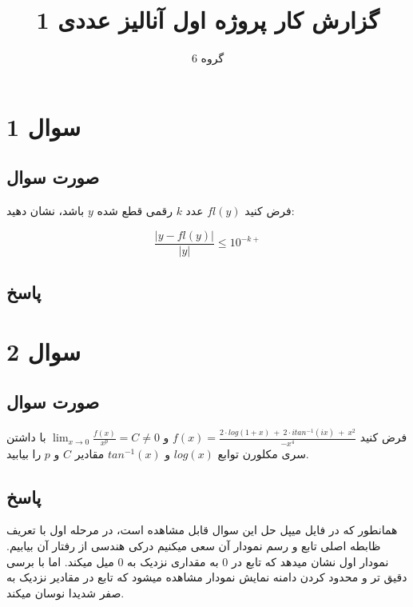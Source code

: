 \documentclass[12pt, letterpaper]{article}
\title{گزارش کار پروژه اول آنالیز عددی 1}
\author{گروه 6}
\begin{document}
\maketitle

\section{سوال 1}
\subsection{صورت سوال}
فرض کنید \(fl(y)\) عدد \(k\) رقمی قطع شده \(y\) باشد، نشان دهید:

\[\frac{\big| y-fl(y) \big| }{\big| y \big|} \le 10^{-k+}\]

\subsection{پاسخ}



\vspace{5mm}

\section{سوال 2}
\subsection{صورت سوال}
فرض کنید
\(f(x) = \frac{2 \cdot log(1+x) \: + \: 2 \cdot i tan^{-1}(ix) \: + \: x^2}{-x^4}\)
و 
\(\lim_{x\to 0}\frac{f(x)}{x^p} = C \ne 0\)
با داشتن سری مکلورن توابع 
\(log(x)\)
و 
\(tan^{-1}(x)\)
مقادیر 
\(C\)
و 
\(p\)
را بیابید.

\subsection{پاسخ}
همانطور که در فایل میپل حل این سوال قابل مشاهده است، در مرحله اول با تعریف ظابطه اصلی تابع و رسم نمودار آن سعی میکنیم درکی هندسی از رفتار آن بیابیم. نمودار اول نشان میدهد که تابع در 0 به مقداری نزدیک به 0 میل میکند. اما با برسی دقیق تر و محدود کردن دامنه نمایش نمودار مشاهده میشود که تابع در مقادیر نزدیک به صفر شدیدا نوسان میکند. \\
\end{document}
